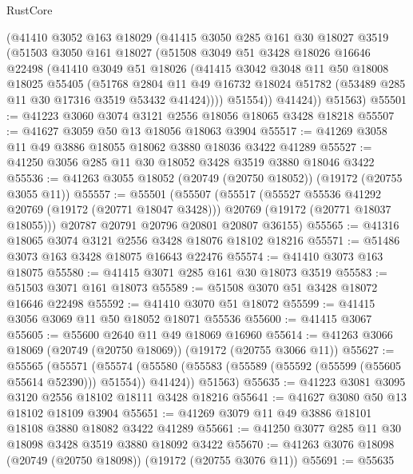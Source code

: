 \begin{lexlean}{RustCore}
\begin{coremodule}
      (@41410
        @3052
        @163
        @18029
        (@41415
          @3050
          @285
          @161
          @30
          @18027
          @3519
          (@51503
            @3050
            @161
            @18027
            (@51508
              @3049
              @51
              @3428
              @18026
              @16646
              @22498
              (@41410
                @3049
                @51
                @18026
                (@41415
                  @3042
                  @3048
                  @11
                  @50
                  @18008
                  @18025
                  @55405
                  (@51768
                    @2804
                    @11
                    @49
                    @16732
                    @18024
                    @51782
                    (@53489 @285 @11 @30 @17316 @3519 @53432 @41424))))
              @51554))
          @41424))
      @51563)
@55501 := @41223 @3060 @3074 @3121 @2556 @18056 @18065 @3428 @18218
@55507 := @41627 @3059 @50 @13 @18056 @18063 @3904
@55517 := @41269 @3058 @11 @49 @3886 @18055 @18062 @3880 @18036 @3422 @41289
@55527 := @41250 @3056 @285 @11 @30 @18052 @3428 @3519 @3880 @18046 @3422
@55536 := @41263 @3055 @18052 (@20749 (@20750 @18052)) (@19172 (@20755 @3055 @11))
@55557 := @55501
    (@55507
      (@55517
        (@55527 @55536 @41292 @20769 (@19172 (@20771 @18047 @3428)))
        @20769
        (@19172 (@20771 @18037 @18055)))
      @20787
      @20791
      @20796
      @20801
      @20807
      @36155)
@55565 := @41316 @18065 @3074 @3121 @2556 @3428 @18076 @18102 @18216
@55571 := @51486 @3073 @163 @3428 @18075 @16643 @22476
@55574 := @41410 @3073 @163 @18075
@55580 := @41415 @3071 @285 @161 @30 @18073 @3519
@55583 := @51503 @3071 @161 @18073
@55589 := @51508 @3070 @51 @3428 @18072 @16646 @22498
@55592 := @41410 @3070 @51 @18072
@55599 := @41415 @3056 @3069 @11 @50 @18052 @18071 @55536
@55600 := @41415 @3067
@55605 := @55600 @2640 @11 @49 @18069 @16960
@55614 := @41263 @3066 @18069 (@20749 (@20750 @18069)) (@19172 (@20755 @3066 @11))
@55627 := @55565
    (@55571
      (@55574 (@55580 (@55583 (@55589 (@55592 (@55599 (@55605 @55614 @52390))) @51554)) @41424))
      @51563)
@55635 := @41223 @3081 @3095 @3120 @2556 @18102 @18111 @3428 @18216
@55641 := @41627 @3080 @50 @13 @18102 @18109 @3904
@55651 := @41269 @3079 @11 @49 @3886 @18101 @18108 @3880 @18082 @3422 @41289
@55661 := @41250 @3077 @285 @11 @30 @18098 @3428 @3519 @3880 @18092 @3422
@55670 := @41263 @3076 @18098 (@20749 (@20750 @18098)) (@19172 (@20755 @3076 @11))
@55691 := @55635

\end{coremodule}
\end{lexlean}
